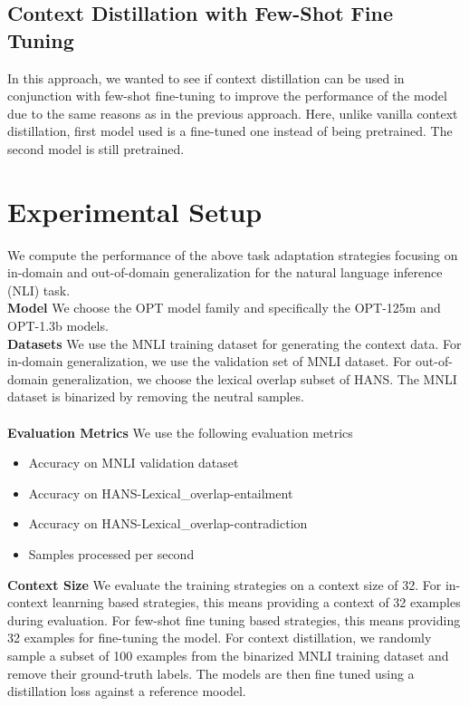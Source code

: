 \documentclass[10pt,twocolumn,letterpaper]{article}
\begin{document}
\subsection{Context Distillation with Few-Shot Fine Tuning}
In this approach, we wanted to see if context distillation can be used in conjunction with few-shot fine-tuning to improve the performance of the model due to the same reasons as
in the previous approach. Here, unlike vanilla context distillation, first model used is a fine-tuned one instead of being pretrained. The second model is still pretrained.

\section{Experimental Setup}
We compute the performance of the above task adaptation strategies focusing on in-domain and out-of-domain generalization for the natural language inference (NLI) task.\\
\textbf{Model} We choose the OPT model family and specifically the OPT-125m and OPT-1.3b models.\\
\textbf{Datasets} We use the MNLI training dataset for generating the context data. For in-domain generalization, we use the validation set of MNLI dataset. For out-of-domain generalization, we choose the lexical overlap subset of HANS. The MNLI dataset is binarized by removing the neutral samples.\\\\
\textbf{Evaluation Metrics} We use the following evaluation metrics
\begin{itemize}
    \item Accuracy on MNLI validation dataset
    \item Accuracy on HANS-Lexical\_overlap-entailment
    \item Accuracy on HANS-Lexical\_overlap-contradiction
    \item Samples processed per second
\end{itemize}
\textbf{Context Size} We evaluate the training strategies on a context size of 32. For in-context leanrning based strategies, this means providing a context of 32 examples during evaluation. For few-shot fine tuning based strategies, this means providing 32 examples for fine-tuning the model. For context distillation, we randomly sample a subset of 100 examples from the binarized MNLI training dataset and remove their ground-truth labels. The models are then fine tuned using a distillation loss against a reference moodel.\\\\
\end{document}
